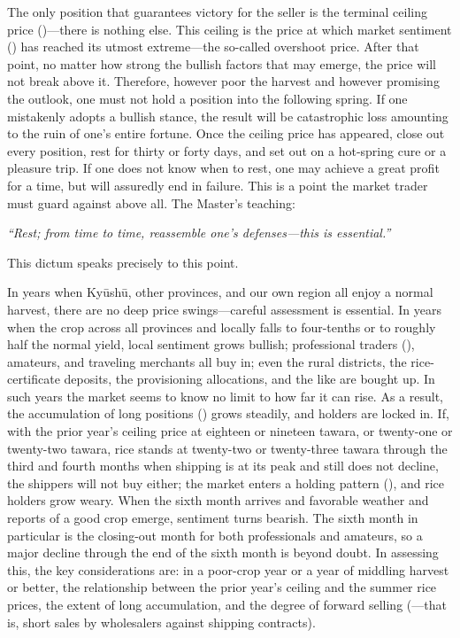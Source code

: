 The only position that guarantees victory for the seller is the terminal
ceiling price ()---there is
nothing else. This ceiling is the price at which market sentiment
() has reached its utmost extreme---the so-called
overshoot price. After that point, no matter how strong the bullish
factors that may emerge, the price will not break above it. Therefore,
however poor the harvest and however promising the outlook, one must not
hold a position into the following spring. If one mistakenly adopts a
bullish stance, the result will be catastrophic loss amounting to the ruin
of one's entire fortune. Once the ceiling price has appeared, close out
every position, rest for thirty or forty days, and set out on a hot-spring
cure or a pleasure trip. If one does not know when to rest, one may
achieve a great profit for a time, but will assuredly end in failure. This
is a point the market trader must guard against above all. The Master's
teaching:

\textit{``Rest; from time to time, reassemble one's defenses---this is
essential.''}

This dictum speaks precisely to this point.


\begin{sokyubox}
{\small\itshape\color{sokyubar} }

\medskip
In years when Ky\=ush\=u, other provinces, and our own region all enjoy a
normal harvest, there are no deep price swings---careful assessment is
essential. In years when the crop across all provinces and locally falls to
four-tenths or to roughly half the normal yield, local sentiment grows
bullish; professional traders (), amateurs, and
traveling merchants all buy in; even the rural districts, the
rice-certificate deposits, the provisioning allocations, and the like are
bought up. In such years the market seems to know no limit to how far it
can rise. As a result, the accumulation of long positions
() grows steadily, and holders are locked in. If,
with the prior year's ceiling price at eighteen or nineteen tawara, or
twenty-one or twenty-two tawara, rice stands at twenty-two or twenty-three
tawara through the third and fourth months when shipping is at its peak
and still does not decline, the shippers will not buy either; the market
enters a holding pattern (), and rice holders grow weary.
When the sixth month arrives and favorable weather and reports of a good
crop emerge, sentiment turns bearish. The sixth month in particular is the
closing-out month for both professionals and amateurs, so a major decline
through the end of the sixth month is beyond doubt. In assessing this, the
key considerations are: in a poor-crop year or a year of middling harvest
or better, the relationship between the prior year's ceiling and the
summer rice prices, the extent of long accumulation, and the degree of
forward selling (---that is, short sales by
wholesalers against shipping contracts).
\end{sokyubox}

